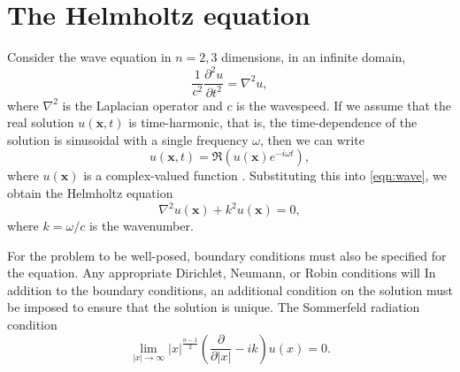 
\iffalse Brief outline of the chapter below

Background:
	What is HH equation?
	What does it model?
	How is it derived?
	Boundary conditions
	- 	Sommerfield radiation condition
	
Finite element method:
	Discretisation of HH
	Discretisation of infinite domains
		D,N,radiation
	ABC, DtN, PML

Linear solvers:
	Iterative and direct
	Krylov methods
	Preconditioners
	How does this relate to Poisson and HH?
	- 	Small wavenumbers good convergence

Project direction:
	Where are we going? What to do...?
	Multigrid in non-cartesian coordinates
	Fourier decompostion of HH
	Explore implementation of PMLs
\fi


\section{The Helmholtz equation}

Consider the wave equation in $n=2,3$ dimensions, in an infinite 
domain,
\[
	\frac{1}{c^2} \frac{\partial^2 u}{\partial t^2} = 
		\nabla^2 u, \label{eqn:wave}
\]
where $\nabla^2$ is the Laplacian operator and $c$ is the wavespeed.
If we assume that the real solution $u(\mathbf{x},t)$ is time-harmonic, that is, the time-dependence of the solution is sinusoidal with a single frequency $\omega$, then we can write
\[
	u(\mathbf{x},t) = 
		\Re \left( u(\mathbf{x})e^{-i\omega t} \right),
\]
where $u(\mathbf{x})$ is a complex-valued function \cite{oomph-hh}.
Substituting this into \ref{eqn:wave}, we obtain the Helmholtz equation
\[
	\nabla^2 u(\mathbf{x}) + k^2 u(\mathbf{x}) = 0, \label{eqn:hh}
\]
where $k=\omega/c$ is the wavenumber.

For the problem to be well-posed, boundary conditions must also be specified for the equation.
Any appropriate Dirichlet, Neumann, or Robin conditions will 
In addition to the boundary conditions, an additional condition on the solution must be imposed to ensure that the solution is unique. 
The Sommerfeld radiation condition \cite{sommerfeld}
\[
\lim_{|x|\rightarrow \infty} |x|^{\frac{n-1}{2}} \left( \frac{\partial}{\partial |x|} - ik \right) u(x) = 0.
\]





